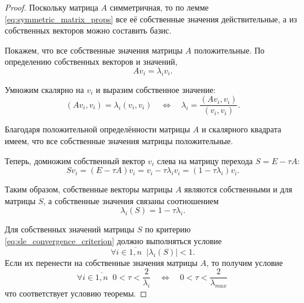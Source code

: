 \documentclass{article}
\begin{document}
\begin{proof}
	Поскольку матрица $A$ симметричная, то по лемме
	\eqref{eq:symmetric_matrix_props} все её собственные значения
	действительные, а из собственных векторов можно составить базис.

	Покажем, что все собственные значения матрицы $A$ положительные.
	По определению собственных векторов и значений,
	\[Av_i=\lambda_iv_i.\]

	Умножим скалярно на $v_i$ и выразим собственное значение:
	\[(Av_i,v_i)=\lambda_i(v_i,v_i)\quad\Leftrightarrow\quad
	\lambda_i=\frac{(Av_i,v_i)}{(v_i,v_i)}.\]

	Благодаря положительной определённости матрицы $A$ и скалярного
	квадрата имеем, что все собственные значения матрицы положительные.

	Теперь, домножим собственный вектор $v_i$ слева на матрицу перехода
	$S=E-\tau A$:
	\[Sv_i=(E-\tau A)v_i=v_i-\tau\lambda_i v_i=(1-\tau\lambda_i)v_i.\]

	Таким образом, собственные векторы матрицы $A$ являются собственными и
	для матрицы $S$, а собственные значения связаны соотношением
	\[\lambda_i(S)=1-\tau\lambda_i.\]

	Для собственных значений матрицы $S$ по критерию
	\eqref{eq:sle_convergence_criterion} должно выполняться условие
	\[\forall i\in\overline{1,n}\;\;|\lambda_i(S)|<1.\]
	Если их перенести на собственные значения матрицы $A$, то получим
	условие
	\[\forall i\in\overline{1,n}\;\;0<\tau<\frac{2}{\lambda_i}\quad
	\Leftrightarrow\quad 0<\tau<\frac{2}{\lambda_{max}}\,\]
	что соответствует условию теоремы.
\end{proof}
\end{document}
